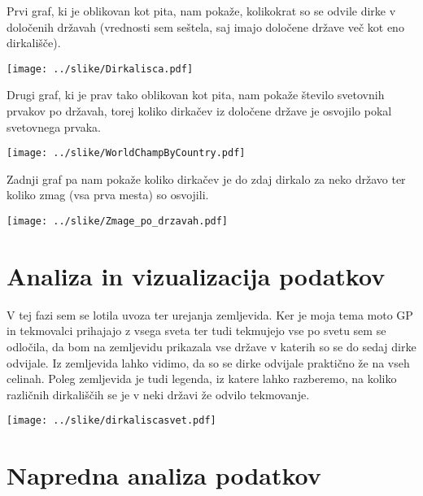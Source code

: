 \documentclass[11pt,a4paper]{article}
\begin{document}
\bigskip

Prvi graf, ki je oblikovan kot pita, nam pokaže, kolikokrat so se odvile dirke v določenih državah (vrednosti sem seštela, saj imajo določene države več kot eno dirkališče).

\texttt{[image: ../slike/Dirkalisca.pdf]}

\newpage
Drugi graf, ki je prav tako oblikovan kot pita, nam pokaže število svetovnih prvakov po državah, torej koliko dirkačev iz določene države je osvojilo pokal svetovnega prvaka.

\texttt{[image: ../slike/WorldChampByCountry.pdf]}

\newpage
Zadnji graf pa nam pokaže koliko dirkačev je do zdaj dirkalo za neko državo ter koliko zmag (vsa prva mesta) so osvojili.

\texttt{[image: ../slike/Zmage\_po\_drzavah.pdf]}

\newpage
\section{Analiza in vizualizacija podatkov}

V tej fazi sem se lotila uvoza ter urejanja zemljevida. Ker je moja tema moto GP in tekmovalci prihajajo z vsega sveta ter tudi tekmujejo vse po svetu sem se odločila, da bom na zemljevidu prikazala vse države v katerih so se do sedaj dirke odvijale. Iz zemljevida lahko vidimo, da so se dirke odvijale praktično že na vseh celinah. Poleg zemljevida je tudi legenda, iz katere lahko razberemo, na koliko različnih dirkališčih se je v neki državi že odvilo tekmovanje. 

\texttt{[image: ../slike/dirkaliscasvet.pdf]}


\section{Napredna analiza podatkov}

\end{document}
